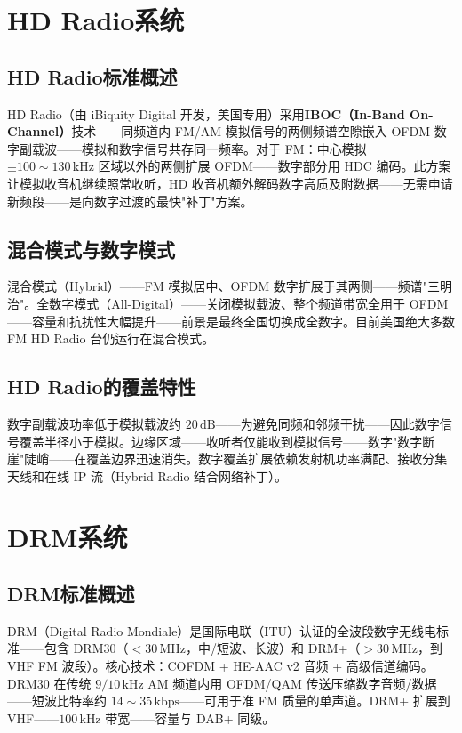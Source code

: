 \documentclass[12pt,UTF8]{ctexbook}
\begin{document}
\section{HD Radio系统}
\label{sec:hd_radio_system}

\subsection{HD Radio标准概述}

HD Radio（由 iBiquity Digital 开发，美国专用）采用\textbf{IBOC（In-Band On-Channel）}技术——同频道内 FM/AM 模拟信号的两侧频谱空隙嵌入 OFDM 数字副载波——模拟和数字信号共存同一频率。对于 FM：中心模拟 $\pm100\sim130\,\mathrm{kHz}$ 区域以外的两侧扩展 OFDM——数字部分用 HDC 编码。此方案让模拟收音机继续照常收听，HD 收音机额外解码数字高质及附数据——无需申请新频段——是向数字过渡的最快"补丁"方案。

\subsection{混合模式与数字模式}

混合模式（Hybrid）——FM 模拟居中、OFDM 数字扩展于其两侧——频谱"三明治"。全数字模式（All-Digital）——关闭模拟载波、整个频道带宽全用于 OFDM——容量和抗扰性大幅提升——前景是最终全国切换成全数字。目前美国绝大多数 FM HD Radio 台仍运行在混合模式。

\subsection{HD Radio的覆盖特性}

数字副载波功率低于模拟载波约 $20\,\mathrm{dB}$——为避免同频和邻频干扰——因此数字信号覆盖半径小于模拟。边缘区域——收听者仅能收到模拟信号——数字"数字断崖"陡峭——在覆盖边界迅速消失。数字覆盖扩展依赖发射机功率满配、接收分集天线和在线 IP 流（Hybrid Radio 结合网络补丁）。

\section{DRM系统}
\label{sec:drm_system}

\subsection{DRM标准概述}

DRM（Digital Radio Mondiale）是国际电联（ITU）认证的全波段数字无线电标准——包含 DRM30（$<30\,\mathrm{MHz}$，中/短波、长波）和 DRM+（$>30\,\mathrm{MHz}$，到VHF FM 波段）。核心技术：COFDM + HE-AAC v2 音频 + 高级信道编码。DRM30 在传统 $9/10\,\mathrm{kHz}$ AM 频道内用 OFDM/QAM 传送压缩数字音频/数据——短波比特率约 $14\sim35\,\mathrm{kbps}$——可用于准 FM 质量的单声道。DRM+ 扩展到 VHF——$100\,\mathrm{kHz}$ 带宽——容量与 DAB+ 同级。
\end{document}
